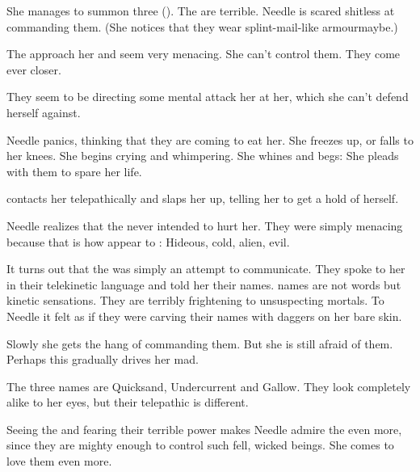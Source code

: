 \begin{comment}
  \section{The Banes arrive}
\end{comment}

She manages to summon three \SitraAchra \quo{\stalkers} (\lesserbanes). 
The \banes{} are terrible. 
Needle is scared shitless at commanding them. 
(She notices that they wear splint-mail-like armour\prikker maybe.)

The \banes{} approach her and seem very menacing. 
She can't control them. 
They come ever closer. 

They seem to be directing some mental attack her at her, which she can't defend herself against. 

Needle panics, thinking that they are coming to eat her. 
She freezes up, or falls to her knees. 
She begins crying and whimpering. 
She whines and begs: 
She pleads with them to spare her life. 

\Achsah{} contacts her telepathically and slaps her up, telling her to get a hold of herself. 

Needle realizes that the \banes{} never intended to hurt her. 
They were simply menacing because that is how \banes{} appear to \humans: 
Hideous, cold, alien, evil. 

It turns out that the \pps{\banes}{}  was simply an attempt to communicate. 
They spoke to her in their telekinetic language and told her their names. 
\Bane{} names are not words but kinetic sensations. 
They are terribly frightening to unsuspecting mortals. 
To Needle it felt as if they were carving their names with daggers on her bare skin. 

Slowly she gets the hang of commanding them. 
But she is still afraid of them. 
Perhaps this gradually drives her mad. 

The three \pps{\banes}{} names are Quicksand, Undercurrent and Gallow. 
They look completely alike to her eyes, but their telepathic  is different. 

Seeing the \banes{} and fearing their terrible power makes Needle admire the \resphain{} even more, since they are mighty enough to control such fell, wicked beings. 
She comes to love them even more. 





